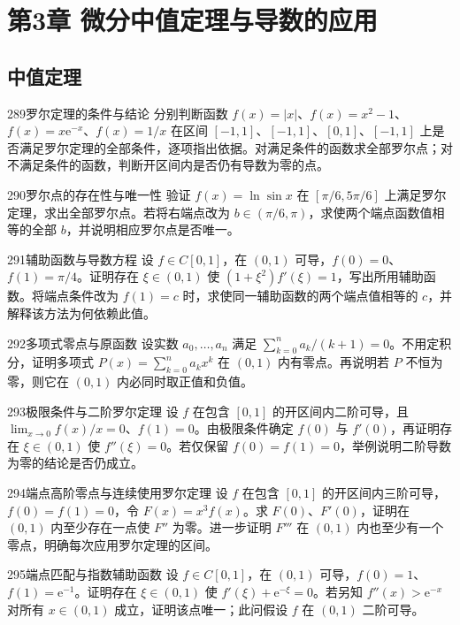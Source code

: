 \section{第3章 微分中值定理与导数的应用}
\subsection{中值定理}
\begin{exercise}{289}{罗尔定理的条件与结论}
分别判断函数 $f(x)=|x|$、$f(x)=x^2-1$、$f(x)=x\mathrm e^{-x}$、$f(x)=1/x$ 在区间 $[-1,1]$、$[-1,1]$、$[0,1]$、$[-1,1]$ 上是否满足罗尔定理的全部条件，逐项指出依据。对满足条件的函数求全部罗尔点；对不满足条件的函数，判断开区间内是否仍有导数为零的点。
\end{exercise}
\begin{exercise}{290}{罗尔点的存在性与唯一性}
验证 $f(x)=\ln\sin x$ 在 $[\pi/6,5\pi/6]$ 上满足罗尔定理，求出全部罗尔点。若将右端点改为 $b\in(\pi/6,\pi)$，求使两个端点函数值相等的全部 $b$，并说明相应罗尔点是否唯一。
\end{exercise}
\begin{exercise}{291}{辅助函数与导数方程}
设 $f\in C[0,1]$，在 $(0,1)$ 可导，$f(0)=0$、$f(1)=\pi/4$。证明存在 $\xi\in(0,1)$ 使 $(1+\xi^2)f'(\xi)=1$，写出所用辅助函数。将端点条件改为 $f(1)=c$ 时，求使同一辅助函数的两个端点值相等的 $c$，并解释该方法为何依赖此值。
\end{exercise}
\begin{exercise}{292}{多项式零点与原函数}
设实数 $a_0,\ldots,a_n$ 满足 $\sum_{k=0}^n a_k/(k+1)=0$。不用定积分，证明多项式 $P(x)=\sum_{k=0}^n a_kx^k$ 在 $(0,1)$ 内有零点。再说明若 $P$ 不恒为零，则它在 $(0,1)$ 内必同时取正值和负值。
\end{exercise}
\begin{exercise}{293}{极限条件与二阶罗尔定理}
设 $f$ 在包含 $[0,1]$ 的开区间内二阶可导，且 $\lim_{x\to0}f(x)/x=0$、$f(1)=0$。由极限条件确定 $f(0)$ 与 $f'(0)$，再证明存在 $\xi\in(0,1)$ 使 $f''(\xi)=0$。若仅保留 $f(0)=f(1)=0$，举例说明二阶导数为零的结论是否仍成立。
\end{exercise}
\begin{exercise}{294}{端点高阶零点与连续使用罗尔定理}
设 $f$ 在包含 $[0,1]$ 的开区间内三阶可导，$f(0)=f(1)=0$，令 $F(x)=x^3f(x)$。求 $F(0)$、$F'(0)$，证明在 $(0,1)$ 内至少存在一点使 $F''$ 为零。进一步证明 $F'''$ 在 $(0,1)$ 内也至少有一个零点，明确每次应用罗尔定理的区间。
\end{exercise}
\begin{exercise}{295}{端点匹配与指数辅助函数}
设 $f\in C[0,1]$，在 $(0,1)$ 可导，$f(0)=1$、$f(1)=\mathrm e^{-1}$。证明存在 $\xi\in(0,1)$ 使 $f'(\xi)+\mathrm e^{-\xi}=0$。若另知 $f''(x)>\mathrm e^{-x}$ 对所有 $x\in(0,1)$ 成立，证明该点唯一；此问假设 $f$ 在 $(0,1)$ 二阶可导。
\end{exercise}
